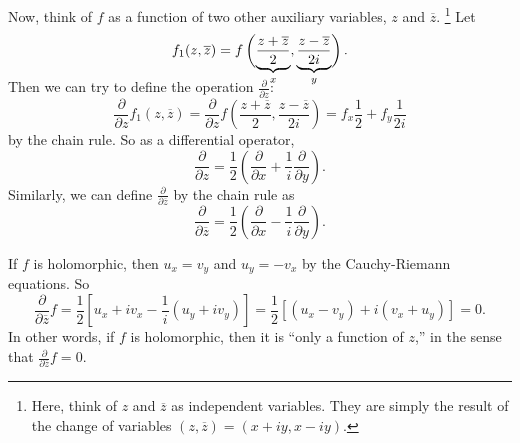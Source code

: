 Now, think of $f$ as a function of two other auxiliary
variables, $z$ and $\overline{z}$.
\footnote{Here, think of $z$ and $\overline{z}$ as
  independent variables. They are simply the result of
  the change of variables
  $(z, \overline{z}) = (x + iy, x - iy)$.}
Let
\[
  f_1(z, \overline{z}) = f\left(\smash[b]{\underbrace{\frac{z + \overline{z}}{2}}_{x}}, \smash[b]{\underbrace{\frac{z - \overline{z}}{2i}}_{y}}\right)
.\]
Then we can try to define the operation
$\frac{\partial}{\partial z}$:
\[
\frac{\partial}{\partial z} f_1(z, \overline{z}) =
\frac{\partial}{\partial z} f\left(\frac{z + \overline{z}}{2}, \frac{z - \overline{z}}{2i}\right) =
f_x \frac{1}{2} + f_y \frac{1}{2i}
\]
by the chain rule. So as a differential operator,
\[
\frac{\partial}{\partial z} = \frac{1}{2} \left(\frac{\partial}{\partial x} + \frac{1}{i} \frac{\partial}{\partial y}\right)
.\]
Similarly, we can define
$\frac{\partial}{\partial \overline{z}}$ by the chain rule
as
\[
\frac{\partial}{\partial \overline{z}} = \frac{1}{2} \left(\frac{\partial}{\partial x} - \frac{1}{i}\frac{\partial}{\partial y}\right)
.\]

If $f$ is holomorphic, then $u_x = v_y$ and $u_y = -v_x$
by the Cauchy-Riemann equations. So
\[
\frac{\partial}{\partial \overline{z}} f = \frac{1}{2}\left[u_x + iv_x - \frac{1}{i}(u_y + iv_y)\right]
= \frac{1}{2}\left[(u_x - v_y) + i(v_x + u_y)\right] = 0
.\]
In other words, if $f$ is holomorphic, then it is
``only a function of $z$,'' in the sense that
$\frac{\partial}{\partial \overline{z}} f = 0$.
